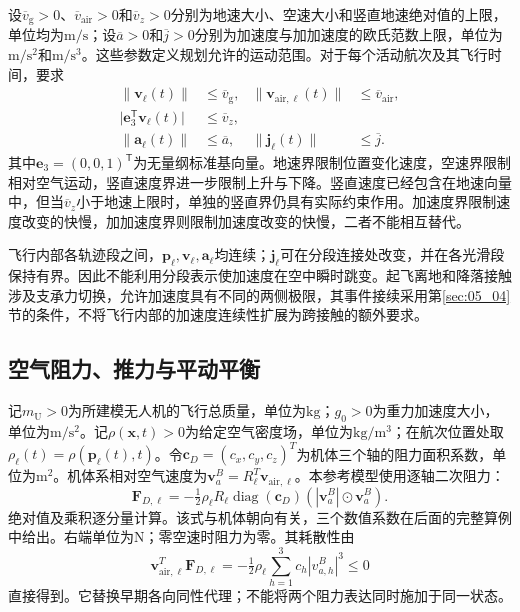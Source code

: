 设$\overline v_{\mathrm g}>0$、$\overline v_{\mathrm{air}}>0$和$\overline v_z>0$分别为地速大小、空速大小和竖直地速绝对值的上限，单位均为$\mathrm{m/s}$；设$\overline a>0$和$\overline j>0$分别为加速度与加加速度的欧氏范数上限，单位为$\mathrm{m/s^2}$和$\mathrm{m/s^3}$。这些参数定义规划允许的运动范围。对于每个活动航次及其飞行时间，要求
\begin{subequations}
\label{s0404:translation_bounds}
\begin{align}
 \|\mathbf v_\ell(t)\|&\le\overline v_{\mathrm g},
 &\|\mathbf v_{\mathrm{air},\ell}(t)\|&\le\overline v_{\mathrm{air}},
 \label{s0404:speed_bounds}\\
 \bigl|\mathbf e_3^{\mathsf T}\mathbf v_\ell(t)\bigr|
 &\le\overline v_z,
 \label{s0404:vertical_speed}\\
 \|\mathbf a_\ell(t)\|&\le\overline a,
 &\|\mathbf j_\ell(t)\|&\le\overline j.
 \label{s0404:acceleration_jerk_bounds}
\end{align}
\end{subequations}
其中$\mathbf e_3=(0,0,1)^{\mathsf T}$为无量纲标准基向量。地速界限制位置变化速度，空速界限制相对空气运动，竖直速度界进一步限制上升与下降。竖直速度已经包含在地速向量中，但当$\overline v_z$小于地速上限时，单独的竖直界仍具有实际约束作用。加速度界限制速度改变的快慢，加加速度界则限制加速度改变的快慢，二者不能相互替代。

飞行内部各轨迹段之间，$\mathbf p_\ell,\mathbf v_\ell,\mathbf a_\ell$均连续；$\mathbf j_\ell$可在分段连接处改变，并在各光滑段保持有界。因此不能利用分段表示使加速度在空中瞬时跳变。起飞离地和降落接触涉及支承力切换，允许加速度具有不同的两侧极限，其事件接续采用第\ref{sec:05_04}节的条件，不将飞行内部的加速度连续性扩展为跨接触的额外要求。

\subsection{空气阻力、推力与平动平衡}

记$m_{\mathrm U}>0$为所建模无人机的飞行总质量，单位为$\mathrm{kg}$；$g_0>0$为重力加速度大小，单位为$\mathrm{m/s^2}$。记$\rho(\mathbf x,t)>0$为给定空气密度场，单位为$\mathrm{kg/m^3}$；在航次位置处取$\rho_\ell(t)=\rho(\mathbf p_\ell(t),t)$。令$\mathbf c_D=(c_x,c_y,c_z)^T$为机体三个轴的阻力面积系数，单位为m$^2$。机体系相对空气速度为$\mathbf v_a^B=R_\ell^T\mathbf v_{\mathrm{air},\ell}$。本参考模型使用逐轴二次阻力：
\begin{equation}
 \mathbf F_{D,\ell}
 =-\tfrac12\rho_\ell R_\ell\operatorname{diag}(\mathbf c_D)
       (|\mathbf v_a^B|\odot\mathbf v_a^B).
 \label{s0404:drag}
\end{equation}
绝对值及乘积逐分量计算。该式与机体朝向有关，三个数值系数在后面的完整算例中给出。右端单位为N；零空速时阻力为零。其耗散性由
\begin{equation}
 \mathbf v_{\mathrm{air},\ell}^T\mathbf F_{D,\ell}
 =-\tfrac12\rho_\ell\sum_{h=1}^3c_h|v_{a,h}^B|^3\le0
\end{equation}
直接得到。它替换早期各向同性代理；不能将两个阻力表达同时施加于同一状态。

